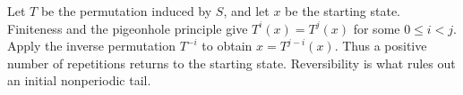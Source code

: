 Let $T$ be the permutation induced by $S$, and let $x$ be the starting state. Finiteness and the pigeonhole principle give $T^i(x)=T^j(x)$ for some $0\le i<j$. Apply the inverse permutation $T^{-i}$ to obtain $x=T^{j-i}(x)$. Thus a positive number of repetitions returns to the starting state. Reversibility is what rules out an initial nonperiodic tail.

